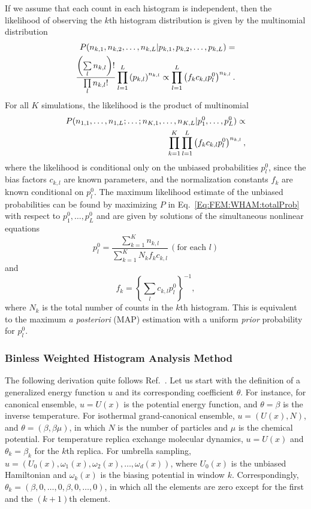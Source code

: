If we assume that each count in each histogram is independent, then the likelihood of observing the $k$th histogram distribution is given by the multinomial distribution
\begin{align}
P(n_{k,1},n_{k,2},\dots,n_{k,L}|p_{k,1},p_{k,2},\dots,p_{k,L})=\notag\\
\frac{\left(\sum\limits_l n_{k,l}\right)!}{\prod\limits_l n_{k,l}!}\prod\limits_{l=1}^L\left(p_{k,l}\right)^{n_{k,l}}\propto\prod\limits_{l=1}^{L}\left(f_kc_{k,l}p_l^0\right)^{n_{k,l}}.
\end{align}
For all $K$ simulations, the likelihood is the product of multinomial
\begin{align}
P(n_{1,1},\dots,n_{1,L};\dots;n_{K,1},\dots,n_{K,L}|p_1^0,\dots,p_L^0)\propto\notag\\
\prod\limits_{k=1}^K\prod\limits_{l=1}^{L}\left(f_kc_{k,l}p_l^0\right)^{n_{k,l}},
\label{Eq:FEM:WHAM:totalProb}
\end{align}
where the likelihood is conditional only on the unbiased probabilities $p_l^0$, since the bias factors $c_{k,l}$ are known parameters, and the normalization constants $f_k$ are known conditional on $p_l^0$. The maximum likelihood estimate of the unbiased probabilities can be found by maximizing $P$ in Eq.~\ref{Eq:FEM:WHAM:totalProb} with respect to $p_1^0,\dots,p_L^0$ and are given by solutions of the simultaneous nonlinear equations
\begin{equation}
p_l^0=\frac{\sum\limits_{k=1}^K n_{k,l}}{\sum\limits_{k=1}^K N_kf_kc_{k,l}}\, (\text{for each }l)
\end{equation}
and
\begin{equation}
f_k={\left\{\sum\limits_lc_{k,l}p_l^0\right\}}^{-1},
\end{equation}
where $N_k$ is the total number of counts in the $k$th histogram. This is equivalent to the maximum \textit{a posteriori} (MAP) estimation with a uniform \textit{prior} probability for $p_l^0$\cite{FergusonJCC2017}.

\subsubsection{Binless Weighted Histogram Analysis Method\label{Sec:FEM:WHAM_BINLESS}}
The following derivation quite follows Ref.~\cite{TanJCP2012}.
Let us start with the definition of a generalized energy function $u$ and its corresponding coefficient $\theta$. For instance, for canonical ensemble, $u=U(x)$ is the potential energy function, and $\theta=\beta$ is the inverse temperature. For isothermal grand-canonical ensemble, $u=(U(x),N)$, and $\theta=(\beta,\beta\mu)$, in which $N$ is the number of particles and $\mu$ is the chemical potential. For temperature replica exchange molecular dynamics, $u=U(x)$ and $\theta_k=\beta_k$ for the $k$th replica. For umbrella sampling, $u=(U_0(x),\omega_1(x),\omega_2(x),\dots,\omega_d(x))$, where $U_0(x)$ is the unbiased Hamiltonian and $\omega_k(x)$ is the biasing potential in window $k$. Correspondingly, $\theta_k=(\beta,0,\dots,0,\beta,0,\dots,0)$, in which all the elements are zero except for the first and the $(k+1)$th element.

